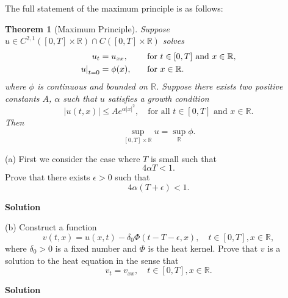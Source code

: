 \documentclass{article}
\newtheorem{theorem}{Theorem}
\begin{document}
The full statement of the maximum principle is as follows:
%
\begin{theorem}[Maximum Principle]
    Suppose
    $u \in C^{2, 1} ([0, T] \times \mathbb{R}) \cap C([0, T] \times \mathbb{R})$
    solves
    \begin{alignat*}{2}
        u_t &= u_{xx}, &&\quad\text{for } t \in [0, T] \text{ and } x \in \mathbb{R}, \\
        \eval[0]{u}_{t = 0} &= \phi(x), &&\quad\text{for } x \in \mathbb{R}.
    \end{alignat*}
    where $\phi$ is continuous and bounded on $\mathbb{R}$. Suppose
    there exists two positive constants $A$, $\alpha$ such that $u$
    satisfies a growth condition
    \begin{equation*}
        |u(t, x)| \leq A e^{\alpha |x|^2},
        \quad \text{for all } t \in [0, T] \text{ and } x \in \mathbb{R}
        .
    \end{equation*}
    Then
    \begin{equation}
        \sup_{[0, T] \times \mathbb{R}} u = \sup_{\mathbb{R}} \phi
        .
        \label{eq:2-1}
    \end{equation}
\end{theorem}
%
(a) First we consider the case where $T$ is small such that
%
\begin{equation}
    4 \alpha T < 1
    .
    \label{eq:2-2}
\end{equation}
%
Prove that there exists $\epsilon > 0$ such that
%
\begin{equation*}
    4 \alpha (T + \epsilon) < 1
    .
\end{equation*}

\textbf{Solution}

\vspace{5mm}

(b) Construct a function
%
\begin{equation*}
    v(t, x) = u(x, t) - \delta_0 \Phi(t - T - \epsilon, x),
    \quad t \in [0, T], x \in \mathbb{R}
    ,
\end{equation*}
%
where $\delta_0 > 0$ is a fixed number and $\Phi$ is the heat kernel.
Prove that $v$ is a solution to the heat equation in the sense that
%
\begin{equation*}
    v_t = v_{xx},
    \quad t \in [0, T], x \in \mathbb{R}
    .
\end{equation*}

\textbf{Solution}

\vspace{5mm}
\end{document}
